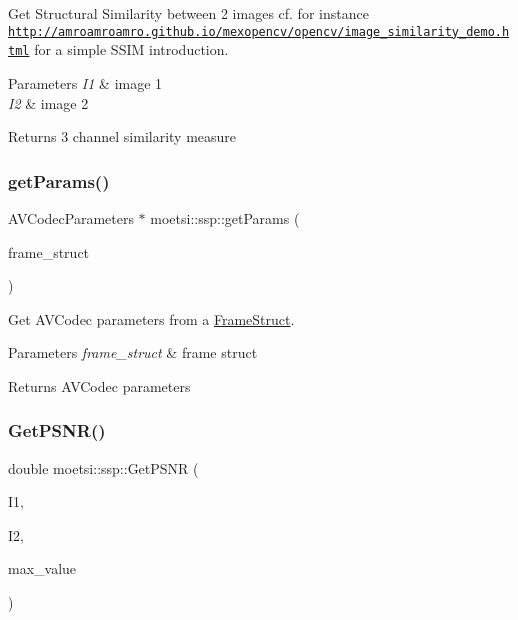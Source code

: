 Get Structural Similarity between 2 images cf. for instance \href{http://amroamroamro.github.io/mexopencv/opencv/image_similarity_demo.html}{\tt http\+://amroamroamro.\+github.\+io/mexopencv/opencv/image\+\_\+similarity\+\_\+demo.\+html} for a simple S\+S\+IM introduction. 


\begin{DoxyParams}{Parameters}
{\em I1} & image 1 \\
\hline
{\em I2} & image 2 \\
\hline
\end{DoxyParams}
\begin{DoxyReturn}{Returns}
3 channel similarity measure 
\end{DoxyReturn}
\mbox{\label{namespacemoetsi_1_1ssp_a2d7925d2be7b96068b314ec08c673df6}} 
\subsubsection{\texorpdfstring{get\+Params()}{getParams()}}
{\footnotesize\ttfamily A\+V\+Codec\+Parameters $\ast$ moetsi\+::ssp\+::get\+Params (\begin{DoxyParamCaption}\item[{\hyperlink{structmoetsi_1_1ssp_1_1FrameStruct}{Frame\+Struct} \&}]{frame\+\_\+struct }\end{DoxyParamCaption})}



Get A\+V\+Codec parameters from a \hyperlink{structmoetsi_1_1ssp_1_1FrameStruct}{Frame\+Struct}. 


\begin{DoxyParams}{Parameters}
{\em frame\+\_\+struct} & frame struct \\
\hline
\end{DoxyParams}
\begin{DoxyReturn}{Returns}
A\+V\+Codec parameters 
\end{DoxyReturn}
\mbox{\label{namespacemoetsi_1_1ssp_a0290f5110cb2cd2c9327c2fa6a528c84}} 
\subsubsection{\texorpdfstring{Get\+P\+S\+N\+R()}{GetPSNR()}}
{\footnotesize\ttfamily double moetsi\+::ssp\+::\+Get\+P\+S\+NR (\begin{DoxyParamCaption}\item[{const Mat \&}]{I1,  }\item[{const Mat \&}]{I2,  }\item[{double}]{max\+\_\+value }\end{DoxyParamCaption})}



